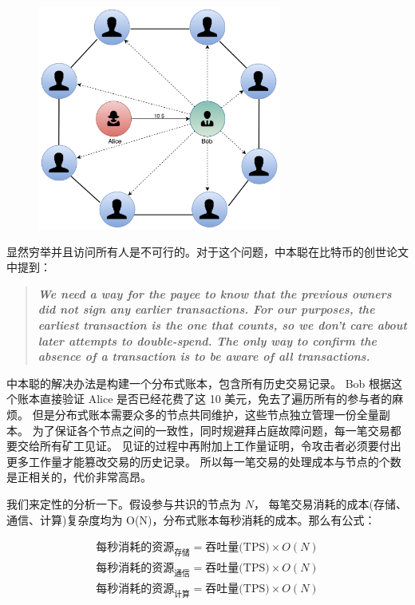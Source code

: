 \begin{figure}[h!]
    \centering
    \includegraphics[width=8cm, keepaspectratio]{../images/Gossip.png}
    \caption{}
    \label{fig:gossip}
\end{figure}
\newpage
显然穷举并且访问所有人是不可行的。对于这个问题，中本聪在比特币的创世论文中提到：

\begin{quote}
    \textbf{\textit{We need a way for the payee to know that the previous owners did not sign any earlier transactions. 
            For our purposes, the earliest transaction is the one that counts, so we don't care about later attempts to double-spend. 
            The only way to confirm the absence of a transaction is to be aware of all transactions.}}
\end{quote}

中本聪的解决办法是构建一个分布式账本，包含所有历史交易记录。
Bob 根据这个账本直接验证 Alice 是否已经花费了这 10 美元，免去了遍历所有的参与者的麻烦。
但是分布式账本需要众多的节点共同维护，这些节点独立管理一份全量副本。
为了保证各个节点之间的一致性，同时规避拜占庭故障问题，每一笔交易都要交给所有矿工见证。
见证的过程中再附加上工作量证明，令攻击者必须要付出更多工作量才能篡改交易的历史记录。
所以每一笔交易的处理成本与节点的个数是正相关的，代价非常高昂。

我们来定性的分析一下。假设参与共识的节点为 $N$，
每笔交易消耗的成本(存储、通信、计算)复杂度均为 O(N)，分布式账本每秒消耗的成本。那么有公式：

\begin{gather}\label{equ:cost}
\text{每秒消耗的资源}_\text{存储} = \text{吞吐量(TPS)} \times O(N) \\
\text{每秒消耗的资源}_\text{通信} = \text{吞吐量(TPS)} \times O(N) \\
\text{每秒消耗的资源}_\text{计算} = \text{吞吐量(TPS)} \times O(N) 
\end{gather}

